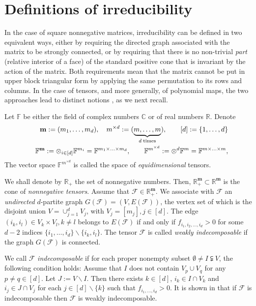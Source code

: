 \documentclass{amsart}
\newcommand{\C}{\mathbb{C}}
\newcommand{\F}{\mathbb{F}}
\newcommand{\R}{\mathbb{R}}
\newcommand{\m}{\mathbf{m}}
\newcommand{\0}{\mathbf{0}}
\newcommand{\1}{\mathbf{1}}
\newcommand{\cF}{\mathcal{F}}
\theoremstyle{remark}
\numberwithin{equation}{section} %
\begin{document}
 \section{Definitions of irreducibility}\label{sec:defirr}
%
 In the case of square nonnegative matrices, irreducibility can be defined
 in two equivalent ways, either by requiring the directed graph
 associated with the matrix to be strongly connected,
 or by requiring that there is no non-trivial \emph{part}
 (relative interior of a face) of the standard positive cone
 that is invariant
 by the action of the matrix. Both requirements mean
%
 that the matrix cannot
 be put in upper block triangular form by applying the same permutation
 to its rows and columns. In the case of tensors, and more generally,
 of polynomial maps, the two approaches lead to distinct notions
 \cite{CPZ08,FGH}, as we next recall. 

Let $\F$ be either the field of complex numbers $\C$ or of real numbers $\R$.
 Denote
 \begin{eqnarray}\label{defbm}
 &&\m:=(m_1,\ldots,m_d),\quad m^{\times d}:=(\underbrace{m,\ldots,m}_{d\;\text{times}}),
\qquad [d]:=\{1,\dots,d\}\\
%
 &&\F^\m:=\otimes_{i\in[d]} \F^{m_i}=\F^{m_1\times\ldots\times m_d}, \qquad
 \F^{m^{\times d}}:= \otimes^d \F^m=\F^{m\times \ldots\times m},\notag
 \end{eqnarray}
 The vector space $\F^{m^{\times d}}$ is called the space of \emph{equidimensional} tensors.
 
We shall denote by $\R_+$ the set of nonnegative numbers.
%
 Then, $\R_+^\m\subset \R^\m$ is the cone of {\em nonnegative tensors}.  Assume that $\cF\in \R_+^\m$.
 We associate with  $\cF$ an {\em undirected} $d$-partite graph
 $G(\cF)=(V,E(\cF))$, the vertex set of which is the disjoint union
 $V=\cup_{j=1}^d V_j$, with $V_j=[m_j], j\in [d]$.
 The edge $(i_k,i_l)\in V_k\times V_l, k\ne l$ belongs
 to $E(\cF)$ if and only if $f_{i_1,i_2,\ldots,i_d}>0$ for some $d-2$
 indices $\{i_1,\ldots,i_d\}\backslash\{i_k,i_l\}$.
 The tensor $\cF$ is called \emph{weakly indecomposable} if the graph $G(\cF)$ is connected.

 We call $\cF$ \emph{indecomposable} if for each proper nonempty subset
 $\emptyset \ne I\subsetneqq V$,
 the following
 condition holds:  Assume that $I$ does not contain $V_p\cup V_q$ for any $p\ne q \in [d]$.
 Let $J:=V\backslash I$.  Then there exists
 $k\in [d]$, %
 $i_k\in I\cap V_k$ and $i_j\in J\cap V_j$ for each $j\in [d]
 \backslash\{k\}$ such that $f_{i_1,\ldots,i_d}>0$.
 It is shown in \cite{FGH} that if $\cF$ is indecomposable then $\cF$ is
 weakly indecomposable.
\end{document}
